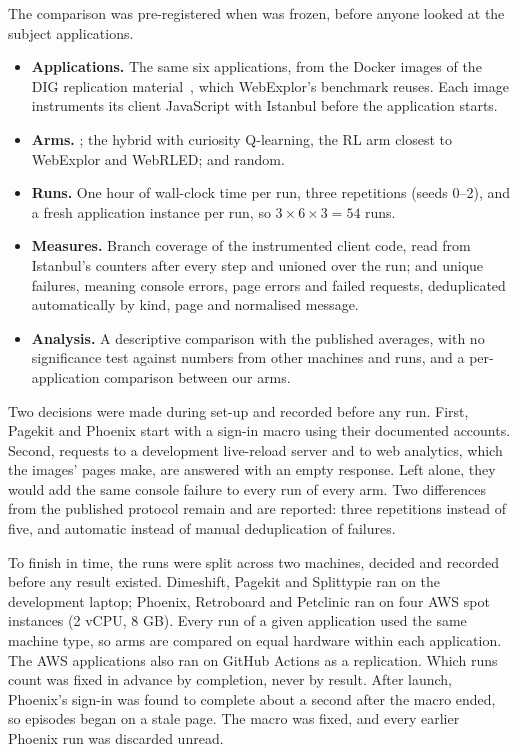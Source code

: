 The comparison was pre-registered when  was frozen, before anyone
looked at the subject applications.
\begin{itemize}
  \item \textbf{Applications.} The same six applications, from the Docker images of the
        DIG replication material~\cite{biagiola2019diversity}, which WebExplor's benchmark
        reuses. Each image instruments its client JavaScript with Istanbul before the
        application starts.
  \item \textbf{Arms.} ; the hybrid with curiosity Q-learning, the RL
        arm closest to WebExplor and WebRLED; and random.
  \item \textbf{Runs.} One hour of wall-clock time per run, three repetitions (seeds 0--2),
        and a fresh application instance per run, so $3 \times 6 \times 3 = 54$ runs.
  \item \textbf{Measures.} Branch coverage of the instrumented client code, read from
        Istanbul's counters after every step and unioned over the run; and unique failures,
        meaning console errors, page errors and failed requests, deduplicated automatically
        by kind, page and normalised message.
  \item \textbf{Analysis.} A descriptive comparison with the published averages, with no
        significance test against numbers from other machines and runs, and a per-application
        comparison between our arms.
\end{itemize}

Two decisions were made during set-up and recorded before any run. First, Pagekit and
Phoenix start with a sign-in macro using their documented accounts. Second, requests to a
development live-reload server and to web analytics, which the images' pages make, are
answered with an empty response. Left alone, they would add the same console failure to
every run of every arm. Two differences from the published protocol remain and are
reported: three repetitions instead of five, and automatic instead of manual deduplication
of failures.

To finish in time, the runs were split across two machines, decided and recorded before any
result existed. Dimeshift, Pagekit and Splittypie ran on the development laptop; Phoenix,
Retroboard and Petclinic ran on four AWS spot instances (2 vCPU, 8 GB). Every run of a given
application used the same machine type, so arms are compared on equal hardware within each
application. The AWS applications also ran on GitHub Actions as a replication. Which runs
count was fixed in advance by completion, never by result. After launch, Phoenix's sign-in
was found to complete about a second after the macro ended, so episodes began on a stale
page. The macro was fixed, and every earlier Phoenix run was discarded unread.


